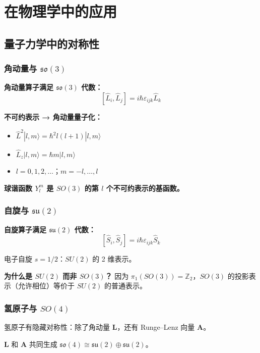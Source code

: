 \section{在物理学中的应用}

\subsection{量子力学中的对称性}

\subsubsection{角动量与 $\mathfrak{so}(3)$}

\textbf{角动量算子满足 $\mathfrak{so}(3)$ 代数：}
\[
[\hat{L}_i, \hat{L}_j] = i\hbar\varepsilon_{ijk}\hat{L}_k
\]

\textbf{不可约表示 → 角动量量子化：}
\begin{itemize}
  \item $\hat{L}^2|l,m\rangle = \hbar^2 l(l+1)|l,m\rangle$
  \item $\hat{L}_z|l,m\rangle = \hbar m|l,m\rangle$
  \item $l = 0, 1, 2, \ldots$；$m = -l, \ldots, l$
\end{itemize}

\textbf{球谐函数 $Y_l^m$ 是 $SO(3)$ 的第 $l$ 个不可约表示的基函数。}

\subsubsection{自旋与 $\mathfrak{su}(2)$}

\textbf{自旋算子满足 $\mathfrak{su}(2)$ 代数：}
\[
[\hat{S}_i, \hat{S}_j] = i\hbar\varepsilon_{ijk}\hat{S}_k
\]

电子自旋 $s = 1/2$：$SU(2)$ 的 2 维表示。

\textbf{为什么是 $SU(2)$ 而非 $SO(3)$？} 因为 $\pi_1(SO(3)) = \mathbb{Z}_2$，$SO(3)$ 的投影表示（允许相位）等价于 $SU(2)$ 的普通表示。

\subsubsection{氢原子与 $SO(4)$}

氢原子有隐藏对称性：除了角动量 $\mathbf{L}$，还有 Runge--Lenz 向量 $\mathbf{A}$。

$\mathbf{L}$ 和 $\mathbf{A}$ 共同生成 $\mathfrak{so}(4) \cong \mathfrak{su}(2) \oplus \mathfrak{su}(2)$。

